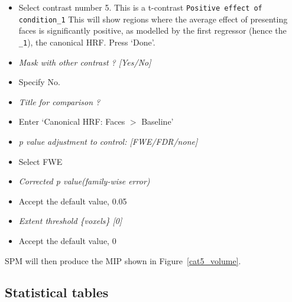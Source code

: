 \documentclass[a4paper,titlepage]{book}
\newcommand{\bi}{\begin{itemize}}
\newcommand{\ei}{\end{itemize}}
\begin{document}
\bi
\item{Select contrast number 5. This is a t-contrast \verb!Positive effect of condition_1! This will show 
regions where the average effect of presenting faces is significantly positive, as modelled by 
the first regressor (hence the \verb!_1!), the 
canonical HRF. Press `Done'.}
\item{\em Mask with other contrast ? [Yes/No]}
\item{Specify No.}
\item{\em Title for comparison ?}
\item{Enter `Canonical HRF: Faces $>$ Baseline'}
\item{\em p value adjustment to control: [FWE/FDR/none]}
\item{Select FWE}
\item{\em Corrected p value(family-wise error)}
\item{Accept the default value, 0.05}
\item{\em Extent threshold \{voxels\} [0]}
\item{Accept the default value, 0}
\ei
SPM will then produce the MIP shown in Figure~\ref{cat5_volume}.

\subsection{Statistical tables}
\end{document}
